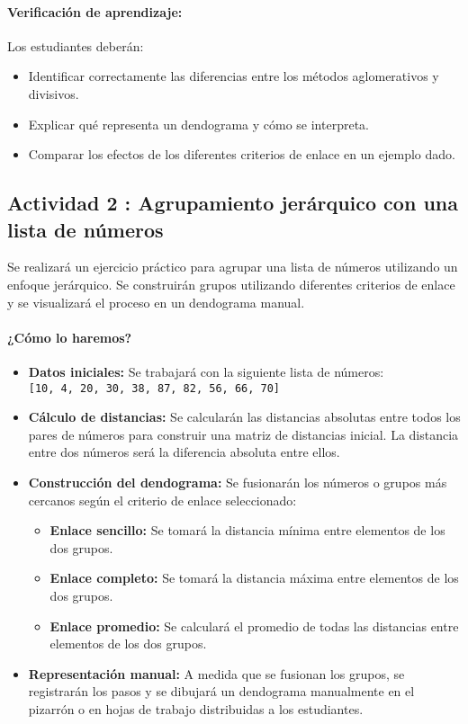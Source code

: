 \documentclass[a4,11pt]{aleph-notas}
\begin{document}
\paragraph{Verificación de aprendizaje:}  
Los estudiantes deberán:
\begin{itemize}[leftmargin=*]
    \item Identificar correctamente las diferencias entre los métodos aglomerativos y divisivos.
    \item Explicar qué representa un dendograma y cómo se interpreta.
    \item Comparar los efectos de los diferentes criterios de enlace en un ejemplo dado.
\end{itemize}

\subsection*{Actividad 2 : Agrupamiento jerárquico con una lista de números}

Se realizará un ejercicio práctico para agrupar una lista de números utilizando un enfoque jerárquico. Se construirán grupos utilizando diferentes criterios de enlace y se visualizará el proceso en un dendograma manual.

\paragraph{¿Cómo lo haremos?}  
\begin{itemize}[leftmargin=*]
    \item \textbf{Datos iniciales:}  
    Se trabajará con la siguiente lista de números: \\[1mm]
    \texttt{[10, 4, 20, 30, 38, 87, 82, 56, 66, 70]}
    
    \item \textbf{Cálculo de distancias:}  
    Se calcularán las distancias absolutas entre todos los pares de números para construir una matriz de distancias inicial. La distancia entre dos números será la diferencia absoluta entre ellos.
    
    \item \textbf{Construcción del dendograma:}  
    Se fusionarán los números o grupos más cercanos según el criterio de enlace seleccionado:
    \begin{itemize}
        \item \textbf{Enlace sencillo:} Se tomará la distancia mínima entre elementos de los dos grupos.
        \item \textbf{Enlace completo:} Se tomará la distancia máxima entre elementos de los dos grupos.
        \item \textbf{Enlace promedio:} Se calculará el promedio de todas las distancias entre elementos de los dos grupos.
    \end{itemize}
    
    \item \textbf{Representación manual:}  
    A medida que se fusionan los grupos, se registrarán los pasos y se dibujará un dendograma manualmente en el pizarrón o en hojas de trabajo distribuidas a los estudiantes.
\end{itemize}
\end{document}
